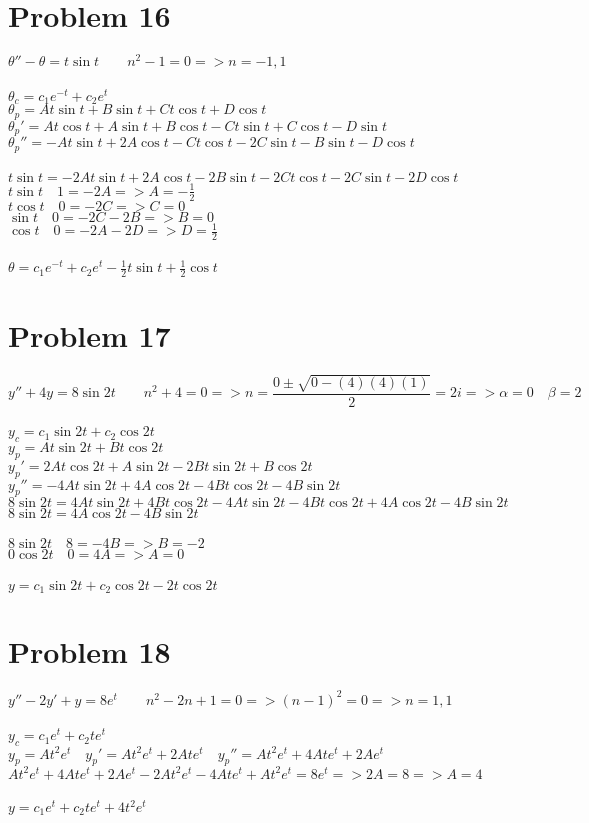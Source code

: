 \documentclass[12pt]{exam}
\begin{document}
\section*{Problem 16}
$\theta''-\theta=t\sin{t}\qquad n^2-1=0=>n=-1,1$\\\\
$\theta_c=c_1e^{-t}+c_2e^t$\\
$\theta_p=At\sin{t}+B\sin{t}+Ct\cos{t}+D\cos{t}$\\
$\theta_p'=At\cos{t}+A\sin{t}+B\cos{t}-Ct\sin{t}+C\cos{t}-D\sin{t}$\\
$\theta_p''=-At\sin{t}+2A\cos{t}-Ct\cos{t}-2C\sin{t}-B\sin{t}-D\cos{t}$\\\\
$t\sin{t}=-2At\sin{t}+2A\cos{t}-2B\sin{t}-2Ct\cos{t}-2C\sin{t}-2D\cos{t}$\\
$t\sin{t}\quad1=-2A=>A=-\frac{1}{2}$\\
$t\cos{t}\quad0=-2C=>C=0$\\
$\sin{t}\quad0=-2C-2B=>B=0$\\
$\cos{t}\quad0=-2A-2D=>D=\frac{1}{2}$\\\\
$\theta=c_1e^{-t}+c_2e^t-\frac{1}{2}t\sin{t}+\frac{1}{2}\cos{t}$
\section*{Problem 17}
$y''+4y=8\sin{2t}\qquad n^2+4=0=>n=\dfrac{0\pm\sqrt{0-(4)(4)(1)}}{2}=2i=>\alpha=0\quad\beta=2$\\\\
$y_c=c_1\sin{2t}+c_2\cos{2t}$\\
$y_p=At\sin{2t}+Bt\cos{2t}$\\
$y_p'=2At\cos{2t}+A\sin{2t}-2Bt\sin{2t}+B\cos{2t}$\\
$y_p''=-4At\sin{2t}+4A\cos{2t}-4Bt\cos{2t}-4B\sin{2t}$\\
$8\sin{2t}=4At\sin{2t}+4Bt\cos{2t}-4At\sin{2t}-4Bt\cos{2t}+4A\cos{2t}-4B\sin{2t}$\\
$8\sin{2t}=4A\cos{2t}-4B\sin{2t}$\\\\
$8\sin{2t}\quad8=-4B=>B=-2$\\
$0\cos{2t}\quad0=4A=>A=0$\\\\
$y=c_1\sin{2t}+c_2\cos{2t}-2t\cos{2t}$
\section*{Problem 18}
$y''-2y'+y=8e^t\qquad n^2-2n+1=0=>(n-1)^2=0=>n=1,1$\\\\
$y_c=c_1e^t+c_2te^t$\\
$y_p=At^2e^t\quad y_p'=At^2e^t+2Ate^t\quad y_p''=At^2e^t+4Ate^t+2Ae^t$\\
$At^2e^t+4Ate^t+2Ae^t-2At^2e^t-4Ate^t+At^2e^t=8e^t=>2A=8=>A=4$\\\\
$y=c_1e^t+c_2te^t+4t^2e^t$
\end{document}
